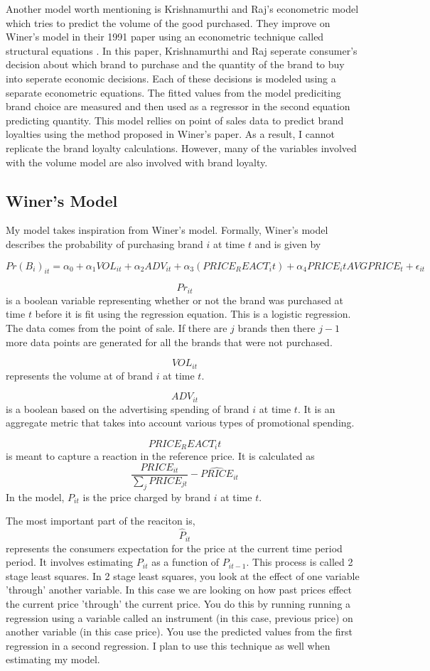 \documentclass{article}
\begin{document}
Another model worth mentioning is Krishnamurthi and Raj's econometric model which tries to predict the volume of the good purchased. They improve on Winer's model in their 1991 paper using an econometric technique called structural equations \cite{krishnamurthi}.  In this paper, Krishnamurthi and Raj seperate consumer's decision about which brand to purchase and the quantity of the brand to buy into seperate economic decisions. Each of these decisions is modeled using a separate econometric equations. The fitted values from the model prediciting brand choice are measured and then used as a regressor in the second equation predicting quantity. This model rellies on point of sales data to predict brand loyalties using the method proposed in Winer's paper. As a result, I cannot replicate the brand loyalty calculations. However, many of the variables involved with the volume model are also involved with brand loyalty.

\subsection{Winer's Model}
My model takes inspiration from Winer's model. Formally, Winer's model describes the probability of purchasing brand $i$ at time $t$ and is given by

$$ {Pr(B_i)}_{it} = \alpha_0 + \alpha_1 {VOL}_{it} + \alpha_2 {ADV}_{it} +  \alpha_3 (PRICE_REACT_it)+ \alpha_4 {PRICE_it}{AVGPRICE_{t}} + \epsilon_{it}$$

$${Pr}_{it}$$ is a boolean variable representing whether or not the brand was purchased at time $t$ before it is fit using the regression equation. This is a logistic regression. The data comes from the point of sale. If there are $j$ brands then there $j-1$ more data points are generated for all the brands that were not purchased.

$$VOL_{it}$$ represents the volume at of brand $i$ at time $t$.

$$ADV_{it}$$ is a boolean based on the advertising spending of brand $i$ at time $t$. It is an aggregate metric that takes into account various types of promotional spending.

$$PRICE_REACT_it$$ is meant to capture a reaction in the reference price. It is calculated as $$\dfrac{PRICE_{it}} {\sum_j PRICE_{jt}} - \hat{PRICE}_{it}$$ In the model, $P_{it}$ is the price charged by brand $i$ at time $t$. 

The most important part of the reaciton is, $$\hat{P}_{it}$$ represents the consumers expectation for the price at the current time period period. It involves estimating ${P}_{it}$ as a function of ${P}_{it-1}$. This process is called 2 stage least squares. In 2 stage least squares, you look at the effect of one variable 'through' another variable.  In this case we are looking on how past prices effect the current price 'through' the current price. You do this by running running a regression using a variable called an instrument (in this case, previous price) on another variable (in this case price). You use the predicted values from the first regression in a second regression.  I plan to use this technique as well when estimating my model.
\end{document}
